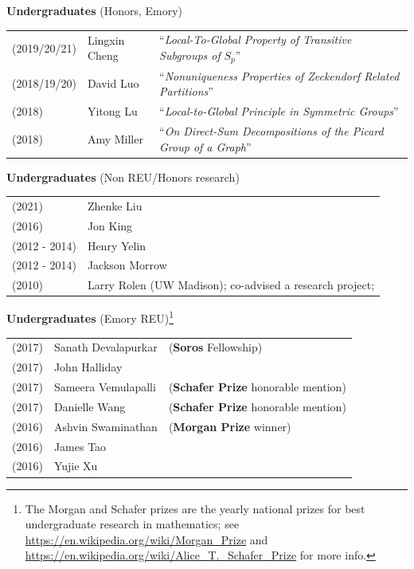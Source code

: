 \documentclass[margin,line]{res}
\newcommand{\defi}[1]{\textsf{#1}} 				%
\begin{document}
\begin{resume}
{\bf Undergraduates} (Honors, Emory)
\vspace*{-.15in}

\begin{tabular}{lll}
  (2019/20/21) & \defi{Lingxin Cheng} & ``\emph{Local-To-Global Property of Transitive Subgroups of} $S_p$''\\
  (2018/19/20) & \defi{David Luo} & ``\emph{Nonuniqueness Properties of Zeckendorf Related Partitions}'' \\
  (2018) & \defi{Yitong Lu} & ``\emph{Local-to-Global Principle in Symmetric Groups}'' \\
  (2018) & \defi{Amy Miller} & ``\emph{On Direct-Sum Decompositions of the Picard Group of a Graph}''
\end{tabular}

{\bf Undergraduates} (Non REU/Honors research)
\vspace*{-.15in}

\begin{tabular}{ll}
 (2021) & \defi{Zhenke Liu} \\
 (2016) & \defi{Jon King} \\  
 (2012 - 2014) & \defi{Henry Yelin} \\
 (2012 - 2014) & \defi{Jackson Morrow} \\
 (2010) &  \defi{Larry Rolen} (UW Madison); co-advised a research project; \\
\end{tabular}


{\bf Undergraduates} (Emory REU)\footnote{The Morgan and Schafer prizes are the yearly national prizes for best undergraduate research in mathematics; see \url{https://en.wikipedia.org/wiki/Morgan_Prize} and \url{https://en.wikipedia.org/wiki/Alice_T._Schafer_Prize} for more info.}
\vspace*{-.15in}

\begin{tabular}{lll}

(2017) & Sanath Devalapurkar  & (\textbf{Soros} Fellowship) \\
(2017) & John Halliday & \\
(2017) &  Sameera Vemulapalli & (\textbf{Schafer Prize} honorable mention)  \\
(2017) & Danielle Wang & (\textbf{Schafer Prize} honorable mention)  \\

(2016) & Ashvin Swaminathan & (\textbf{Morgan Prize} winner)  \\
(2016) & James Tao & \\
(2016) & Yujie Xu & \\


\end{tabular}
\end{resume}
\end{document}
